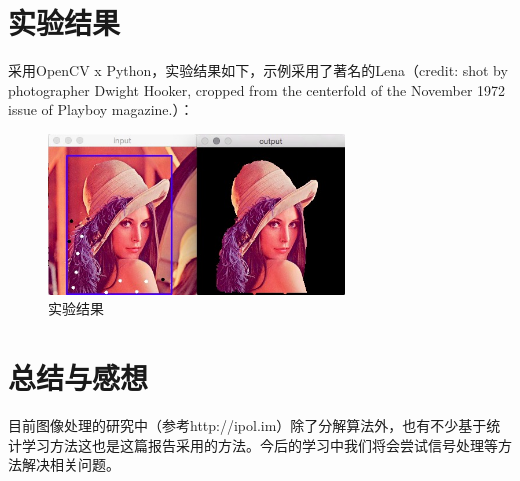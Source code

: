 \documentclass[a4paper, 11pt, nofonts, nocap, fancyhdr, hyperref, UTF8]{ctexart}
\begin{document}
\section{实验结果}
采用OpenCV\cite{bradski2008learning} x Python，实验结果如下，示例采用了著名的Lena（credit: shot by photographer Dwight Hooker, cropped from the centerfold of the November 1972 issue of Playboy magazine.）：
\begin{figure}[!h]
    \centering
    \includegraphics[width=0.7\textwidth]{figures/lena.jpg}
    \caption{实验结果}
\end{figure}

\section{总结与感想}
目前图像处理的研究中（参考http://ipol.im）除了分解算法外，也有不少基于统计学习方法这也是这篇报告采用的方法。今后的学习中我们将会尝试信号处理等方法解决相关问题。



\end{document}
